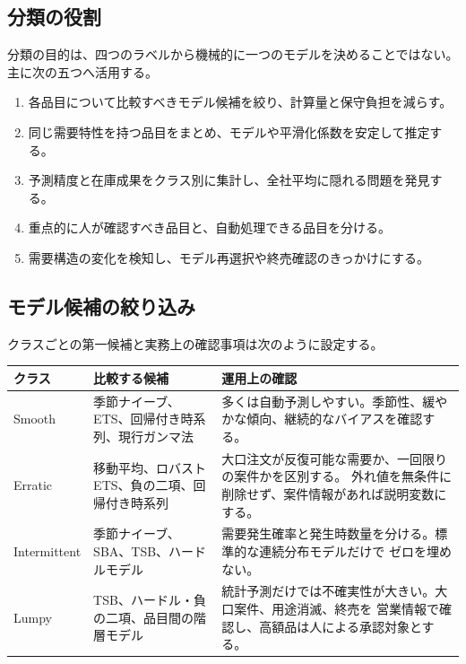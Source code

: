 \documentclass[a4paper,11pt]{jsarticle}
\begin{document}
\subsection{分類の役割}

分類の目的は、四つのラベルから機械的に一つのモデルを決めることではない。
主に次の五つへ活用する。
\begin{enumerate}
\item 各品目について比較すべきモデル候補を絞り、計算量と保守負担を減らす。
\item 同じ需要特性を持つ品目をまとめ、モデルや平滑化係数を安定して推定する。
\item 予測精度と在庫成果をクラス別に集計し、全社平均に隠れる問題を発見する。
\item 重点的に人が確認すべき品目と、自動処理できる品目を分ける。
\item 需要構造の変化を検知し、モデル再選択や終売確認のきっかけにする。
\end{enumerate}

\subsection{モデル候補の絞り込み}

クラスごとの第一候補と実務上の確認事項は次のように設定する。
\begin{center}
\begin{tabular}{>{\raggedright\arraybackslash}p{22mm}
                >{\raggedright\arraybackslash}p{43mm}
                >{\raggedright\arraybackslash}p{67mm}}
\toprule
クラス & 比較する候補 & 運用上の確認\\
\midrule
Smooth &
季節ナイーブ、ETS、回帰付き時系列、現行ガンマ法 &
多くは自動予測しやすい。季節性、緩やかな傾向、継続的なバイアスを確認する。\\
Erratic &
移動平均、ロバストETS、負の二項、回帰付き時系列 &
大口注文が反復可能な需要か、一回限りの案件かを区別する。
外れ値を無条件に削除せず、案件情報があれば説明変数にする。\\
Intermittent &
季節ナイーブ、SBA、TSB、ハードルモデル &
需要発生確率と発生時数量を分ける。標準的な連続分布モデルだけで
ゼロを埋めない。\\
Lumpy &
TSB、ハードル・負の二項、品目間の階層モデル &
統計予測だけでは不確実性が大きい。大口案件、用途消滅、終売を
営業情報で確認し、高額品は人による承認対象とする。\\
\bottomrule
\end{tabular}
\end{center}
\end{document}

